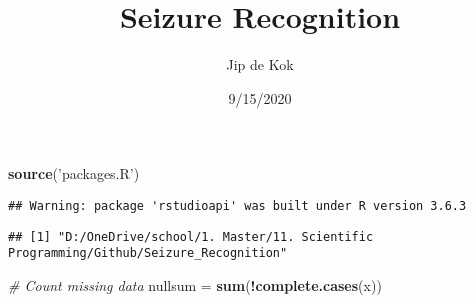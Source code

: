 \documentclass[
]{article}
\title{Seizure Recognition}
\author{Jip de Kok}
\date{9/15/2020}
\newenvironment{Shaded}{\begin{snugshade}}{\end{snugshade}}
\newcommand{\CommentTok}[1]{\textcolor[rgb]{0.56,0.35,0.01}{\textit{#1}}}
\newcommand{\DataTypeTok}[1]{\textcolor[rgb]{0.13,0.29,0.53}{#1}}
\newcommand{\KeywordTok}[1]{\textcolor[rgb]{0.13,0.29,0.53}{\textbf{#1}}}
\newcommand{\NormalTok}[1]{#1}
\newcommand{\OperatorTok}[1]{\textcolor[rgb]{0.81,0.36,0.00}{\textbf{#1}}}
\newcommand{\StringTok}[1]{\textcolor[rgb]{0.31,0.60,0.02}{#1}}
\begin{document}
\maketitle

\begin{Shaded}
\begin{Highlighting}[]
\KeywordTok{source}\NormalTok{(}\StringTok{'packages.R'}\NormalTok{)}
\end{Highlighting}
\end{Shaded}

\begin{verbatim}
## Warning: package 'rstudioapi' was built under R version 3.6.3
\end{verbatim}

\begin{Shaded}
\end{Shaded}

\begin{verbatim}
## [1] "D:/OneDrive/school/1. Master/11. Scientific Programming/Github/Seizure_Recognition"
\end{verbatim}

\begin{Shaded}
\end{Shaded}

\begin{Shaded}
\begin{Highlighting}[]
\CommentTok{# Count missing data}
\NormalTok{nullsum =}\StringTok{ }\KeywordTok{sum}\NormalTok{(}\OperatorTok{!}\KeywordTok{complete.cases}\NormalTok{(x))}
\end{Highlighting}
\end{Shaded}
\end{document}

